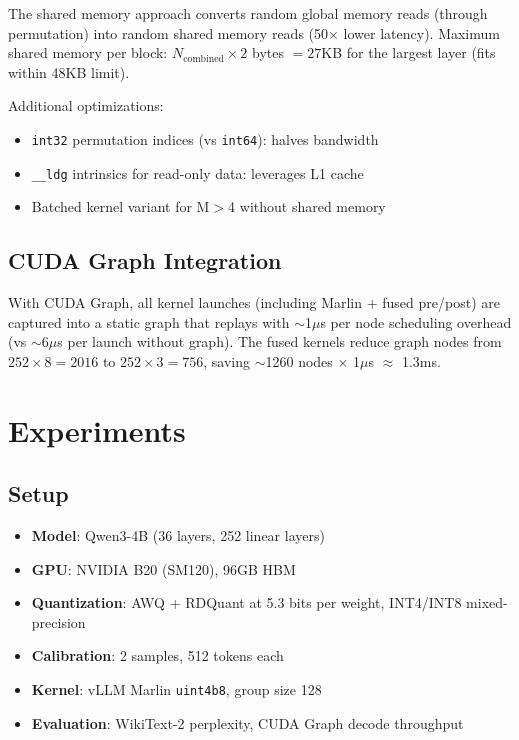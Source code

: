 \documentclass[11pt,a4paper]{article}
\begin{document}
The shared memory approach converts random global memory reads (through permutation) into random shared memory reads (50$\times$ lower latency). Maximum shared memory per block: $N_{\text{combined}} \times 2$ bytes $= 27$KB for the largest layer (fits within 48KB limit).

Additional optimizations:
\begin{itemize}
    \item \texttt{int32} permutation indices (vs \texttt{int64}): halves bandwidth
    \item \texttt{\_\_ldg} intrinsics for read-only data: leverages L1 cache
    \item Batched kernel variant for M$>$4 without shared memory
\end{itemize}

\subsection{CUDA Graph Integration}

With CUDA Graph, all kernel launches (including Marlin + fused pre/post) are captured into a static graph that replays with $\sim$1$\mu$s per node scheduling overhead (vs $\sim$6$\mu$s per launch without graph). The fused kernels reduce graph nodes from $252 \times 8 = 2016$ to $252 \times 3 = 756$, saving $\sim$1260 nodes $\times$ 1$\mu$s $\approx$ 1.3ms.


\section{Experiments}
\label{sec:experiments}

\subsection{Setup}

\begin{itemize}
    \item \textbf{Model}: Qwen3-4B (36 layers, 252 linear layers)
    \item \textbf{GPU}: NVIDIA B20 (SM120), 96GB HBM
    \item \textbf{Quantization}: AWQ + RDQuant at 5.3 bits per weight, INT4/INT8 mixed-precision
    \item \textbf{Calibration}: 2 samples, 512 tokens each
    \item \textbf{Kernel}: vLLM Marlin \texttt{uint4b8}, group size 128
    \item \textbf{Evaluation}: WikiText-2 perplexity, CUDA Graph decode throughput
\end{itemize}
\end{document}
